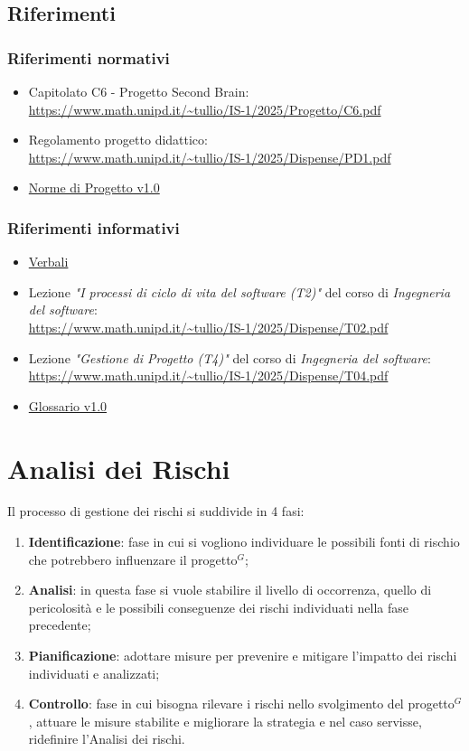 \documentclass[a4paper,10pt]{article}
\begin{document}
\subsection{Riferimenti}
\subsubsection{Riferimenti normativi}
\begin{itemize}
  \item Capitolato C6 - Progetto Second Brain: \\  \url{https://www.math.unipd.it/~tullio/IS-1/2025/Progetto/C6.pdf}
  \item Regolamento progetto didattico: \\ \url{https://www.math.unipd.it/~tullio/IS-1/2025/Dispense/PD1.pdf}
  \item \href{https://tool-8.github.io/Documentazione-SWE/}{Norme di Progetto v1.0}
\end{itemize}
\subsubsection{Riferimenti informativi}
\begin{itemize}
  \item \href{https://tool-8.github.io/Documentazione-SWE/}{Verbali}
  \item Lezione \textit{"I processi di ciclo di vita del software (T2)"} del corso di \textit{Ingegneria del software}: \\ \url{https://www.math.unipd.it/~tullio/IS-1/2025/Dispense/T02.pdf}
  \item Lezione \textit{"Gestione di Progetto (T4)"} del corso di \textit{Ingegneria del software}: \\ \url{https://www.math.unipd.it/~tullio/IS-1/2025/Dispense/T04.pdf}
  \item \href{https://tool-8.github.io/Documentazione-SWE/glossario/Glossario.pdf}{Glossario v1.0}
\end{itemize}

\newpage

\section{Analisi dei Rischi}
Il processo di gestione dei rischi si suddivide in 4 fasi:
\begin{enumerate}
  \item \textbf{Identificazione}: fase in cui si vogliono individuare le possibili fonti di rischio che potrebbero influenzare il progetto$^G$;
  \item \textbf{Analisi}: in questa fase si vuole stabilire il livello di occorrenza, quello di pericolosità e le possibili conseguenze dei rischi individuati nella fase precedente;
  \item \textbf{Pianificazione}: adottare misure per prevenire e mitigare l'impatto dei rischi individuati e analizzati;
  \item \textbf{Controllo}: fase in cui bisogna rilevare i rischi nello svolgimento del progetto$^G$, attuare le misure stabilite e migliorare la strategia e nel caso servisse, ridefinire l'Analisi dei rischi.
\end{enumerate}
\end{document}
